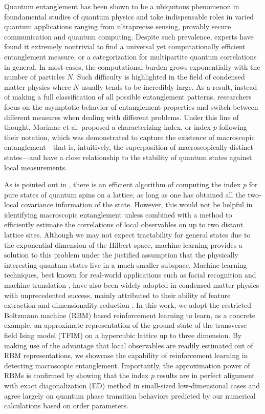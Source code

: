 \documentclass[aps,prl,reprint,superscriptaddress]{revtex4-2}
\begin{document}
Quantum entanglement has been shown to be a ubiquitous phenomenon in foundamental studies of quantum physics and take indispensable roles in varied quantum applications ranging from ultraprecise sensing, provably secure communication and quantum computing. Despite such prevalence, experts have found it extremely nontrivial to find a universal yet computationally efficient entanglement measure, or a categorization for multipartite quantum correlations in general. In most cases, the computational burden grows exponentially with the number of particles $ N $. Such difficulty is highlighted in the field of condensed matter physics where $ N $ usually tends to be incredibly large. As a result, instead of making a full classification of all possible entanglement patterns, researchers focus on the asymptotic behavior of entanglement properties and switch between different measures when dealing with different problems. Under this line of thought, Morimae et al. \cite{Morimae2005Macroscopic} proposed a characterizing index, or index $ p $ following their notation, which was demonstrated to capture the existence of macroscopic entanglement---that is, intuitively, the superposition of macroscopically distinct states---and have a close relationship to the stability of quantum states against local measurements.

As is pointed out in \cite{Morimae2005Macroscopic}, there is an efficient algorithm of computing the index $ p $ for pure states of quantum spins on a lattice, as long as one has obtained all the two-local covariance information of the state. However, this would not be helpful in identifying macroscopic entanglement unless combined with a method to efficiently estimate the correlations of local observables on up to two distant lattice sites. Although we may not expect tractability for general states due to the exponential dimension of the Hilbert space, machine learning provides a solution to this problem under the justified assumption that the physically interesting quantum states live in a much smaller subspace. Machine learning techniques, best known for real-world applications such as facial recognition and machine translation \cite{Lecun2015Deep}, have also been widely adopted in condensed matter physics with unprecedented success, mainly attributed to their ability of feature extraction and dimensionality reduction \cite{Carleo2017Solving,Carrasquilla2017ML-phase,Deng2017ML-topo,Deng2018ML-Bell,Dunjko2018ML-AI-quantum-review}. In this work, we adopt the restricted Boltzmann machine (RBM) based reinforcement learning to learn, as a concrete example, an approximate representation of the ground state of the transverse field Ising model (TFIM) on a hypercubic lattice up to three dimension. By making use of the advantage that local observables are readily estimated out of RBM representations, we showcase the capability of reinforcement learning in detecting macroscopic entanglement. Importantly, the approximation power of RBMs is confirmed by showing that the index $ p $ results are in perfect alignment with exact diagonalization (ED) method in small-sized low-dimensional cases and agree largely on quantum phase transition behaviors predicted by our numerical calculations based on order parameters.
\end{document}
